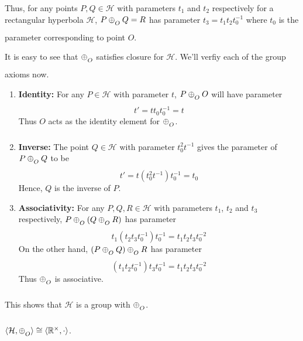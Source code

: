 Thus, for any points $P,Q\in\mathcal{H}$ with parameters $t_1$ and $t_2$
respectively for a rectangular hyperbola $\mathcal{H}$, $P \conop Q = R$ has
parameter $t_3 = t_1 t_2 t_0^{-1}$ where $t_0$ is the parameter corresponding to
point $O$.
\vspace{1ex}

It is easy to see that $\conop$ satisfies closure for $\mathcal{H}$. We'll verfiy
each of  the group axioms now.

\begin{enumerate}
    \item{\textbf{Identity:}} For any $P\in\mathcal{H}$ with parameter $t$,
        $P \conop O$ will have parameter
        \[ t' = t t_0 t_0^{-1} = t \]
        Thus $O$ acts as the identity element for $\conop$.

    \item{\textbf{Inverse:}} The point $Q\in\mathcal{H}$ with parameter
        $t_0^2 t^{-1}$ gives the parameter of $P \conop Q$ to be
        \[ t' = t (t_0^2 t^{-1}) t_0^{-1} = t_0 \]
        Hence, $Q$ is the inverse of $P$.

    \item{\textbf{Associativity:}} For any $P,Q,R\in\mathcal{H}$ with parameters
        $t_1$, $t_2$ and $t_3$ respectively, $P\conop(Q \conop R)$ has parameter
        \[ t_1 (t_2 t_3 t_0^{-1}) t_0^{-1} = t_1 t_2 t_3 t_0^{-2} \]
        On the other hand, $(P \conop Q)\conop R$ has parameter
        \[ (t_1 t_2 t_0^{-1}) t_3 t_0^{-1} = t_1 t_2 t_3 t_0^{-2} \]
        Thus $\conop$ is associative.
\end{enumerate}

\noindent
This shows that $\mathcal{H}$ is a group with $\conop$.

\begin{theorem}
    $\langle \mathcal{H},\conop \rangle \cong \langle \mathbb{R}^\times,\cdot \rangle$.
\end{theorem}

